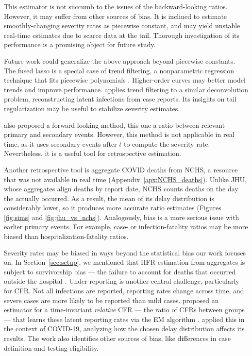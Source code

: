 \documentclass{article}
\begin{document}
This estimator is not succumb to the issues of the backward-looking ratios. However, it may suffer from other sources of bias. It is inclined to estimate smoothly-changing severity rates as piecewise constant, and may yield unstable real-time estimates due to scarce data at the tail. 
Thorough investigation of its performance is a promising object for future study.

Future work could generalize the above approach beyond piecewise constants. The fused lasso is a special case of trend filtering, a nonparametric regression technique that fits piecewise polynomials \citet{Tibshirani2014}. Higher-order curves may better model trends and improve performance. \citep{Jahja2022} applies trend filtering to a similar deconvolution problem, reconstructing latent infections from case reports. Its insights on tail regularization may be useful to stabilize severity estimates. 

\citet{UKpaper} also proposed a forward-looking method, this one a ratio between relevant primary and secondary events. However, this method is not applicable in real time, as it uses secondary events after $t$ to compute the severity rate. Nevertheless, it is a useful tool for retrospective estimation. 

Another retrospective tool is aggregate COVID deaths from NCHS, a resource that
was not available in real time (Appendix~\ref{apx:NCHS_deaths}). Unlike JHU,
whose aggregates align deaths by report date, NCHS counts deaths on the day the
actually occurred. As a result, the mean of its delay distribution is
considerably lower, so it produces more accurate ratio estimates (Figures
\ref{fig:sims} and \ref{fig:jhu_vs_nchs}). Analogously, bias is a more serious
issue with earlier primary events. For example, case- or infection-fatality
ratios may be more biased than hospitalization-fatality ratios. 

Severity rates may be biased in ways beyond the statistical bias our work
focuses on. 
In Section~\ref{sec:setup}, we mentioned that 
HFR estimation from aggregates is subject to survivorship bias --- 
the failure to account for deaths that occurred outside the hospital \citep{lipsitch2015potential}.
Under-reporting is another central challenge, particularly for CFR.
Not all infections are reported, reporting rates change across time, and severe
cases are more likely to be reported than mild cases.
\citet{reich2012estimating} proposed an estimator for a time-invariant
\textit{relative} CFR --- the ratio of CFRs between groups --- that learns these
latent reporting rates via the EM algorithm \citep{EM}. \citet{anastasios}
applied this in the context of COVID-19, analyzing how the chosen delay
distribution affects its results. The work also identifies other sources of bias, like
differences in case definition and testing eligibility.
\end{document}
